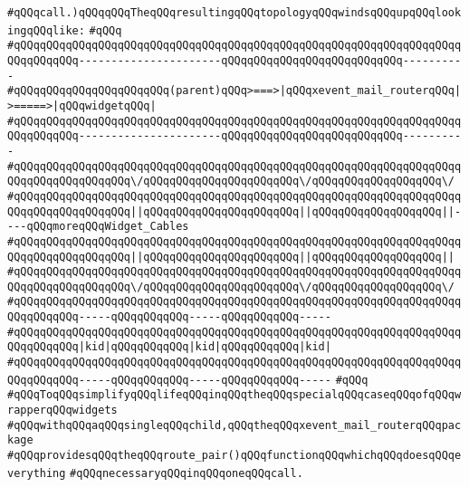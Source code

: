 \verb|#qQQqcall.)qQQqqQQqTheqQQqresultingqQQqtopologyqQQqwindsqQQqupqQQqlookingqQQqlike:|\newline
\verb|#qQQq|\newline
\verb|#qQQqqQQqqQQqqQQqqQQqqQQqqQQqqQQqqQQqqQQqqQQqqQQqqQQqqQQqqQQqqQQqqQQqqQQqqQQqqQQq----------------------qQQqqQQqqQQqqQQqqQQqqQQqqQQq----------|\newline
\verb|#qQQqqQQqqQQqqQQqqQQqqQQq(parent)qQQq>===>|\verb#|qQQqxevent_mail_routerqQQq|>=====>|qQQqwidgetqQQq|#\newline
\verb|#qQQqqQQqqQQqqQQqqQQqqQQqqQQqqQQqqQQqqQQqqQQqqQQqqQQqqQQqqQQqqQQqqQQqqQQqqQQqqQQq----------------------qQQqqQQqqQQqqQQqqQQqqQQqqQQq----------|\newline
\verb|#qQQqqQQqqQQqqQQqqQQqqQQqqQQqqQQqqQQqqQQqqQQqqQQqqQQqqQQqqQQqqQQqqQQqqQQqqQQqqQQqqQQqqQQq\/qQQqqQQqqQQqqQQqqQQqqQQq\/qQQqqQQqqQQqqQQqqQQq\/|\newline
\verb|#qQQqqQQqqQQqqQQqqQQqqQQqqQQqqQQqqQQqqQQqqQQqqQQqqQQqqQQqqQQqqQQqqQQqqQQqqQQqqQQqqQQqqQQq|\verb#||qQQqqQQqqQQqqQQqqQQqqQQq||qQQqqQQqqQQqqQQqqQQq||----qQQqmoreqQQqWidget_Cables#\newline
\verb|#qQQqqQQqqQQqqQQqqQQqqQQqqQQqqQQqqQQqqQQqqQQqqQQqqQQqqQQqqQQqqQQqqQQqqQQqqQQqqQQqqQQqqQQq|\verb#||qQQqqQQqqQQqqQQqqQQqqQQq||qQQqqQQqqQQqqQQqqQQq||#\newline
\verb|#qQQqqQQqqQQqqQQqqQQqqQQqqQQqqQQqqQQqqQQqqQQqqQQqqQQqqQQqqQQqqQQqqQQqqQQqqQQqqQQqqQQqqQQq\/qQQqqQQqqQQqqQQqqQQqqQQq\/qQQqqQQqqQQqqQQqqQQq\/|\newline
\verb|#qQQqqQQqqQQqqQQqqQQqqQQqqQQqqQQqqQQqqQQqqQQqqQQqqQQqqQQqqQQqqQQqqQQqqQQqqQQqqQQq-----qQQqqQQqqQQq-----qQQqqQQqqQQq-----|\newline
\verb|#qQQqqQQqqQQqqQQqqQQqqQQqqQQqqQQqqQQqqQQqqQQqqQQqqQQqqQQqqQQqqQQqqQQqqQQqqQQqqQQq|\verb#|kid|qQQqqQQqqQQq|kid|qQQqqQQqqQQq|kid|#\newline
\verb|#qQQqqQQqqQQqqQQqqQQqqQQqqQQqqQQqqQQqqQQqqQQqqQQqqQQqqQQqqQQqqQQqqQQqqQQqqQQqqQQq-----qQQqqQQqqQQq-----qQQqqQQqqQQq-----|\newline
\verb|#qQQq|\newline
\verb|#qQQqToqQQqsimplifyqQQqlifeqQQqinqQQqtheqQQqspecialqQQqcaseqQQqofqQQqwrapperqQQqwidgets|\newline
\verb|#qQQqwithqQQqaqQQqsingleqQQqchild,qQQqtheqQQqxevent_mail_routerqQQqpackage|\newline
\verb|#qQQqprovidesqQQqtheqQQqroute_pair()qQQqfunctionqQQqwhichqQQqdoesqQQqeverything|\newline
\verb|#qQQqnecessaryqQQqinqQQqoneqQQqcall.|\newline
